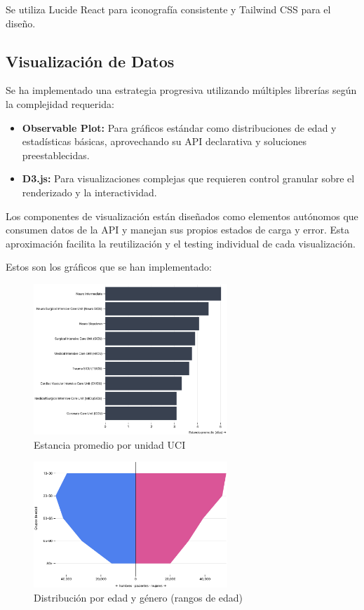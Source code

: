 Se utiliza Lucide React para iconografía consistente y Tailwind CSS para el diseño.

\subsection{Visualización de Datos}

Se ha implementado una estrategia progresiva utilizando múltiples librerías según la complejidad requerida:

\begin{itemize}
\item \textbf{Observable Plot:} Para gráficos estándar como distribuciones de edad y estadísticas básicas, aprovechando su API declarativa y soluciones preestablecidas.
\item \textbf{D3.js:} Para visualizaciones complejas que requieren control granular sobre el renderizado y la interactividad.
\end{itemize}

Los componentes de visualización están diseñados como elementos autónomos que consumen datos de la API y manejan sus propios estados de carga y error. Esta aproximación facilita la reutilización y el testing individual de cada visualización.

Estos son los gráficos que se han implementado:



\begin{figure}[H]
  \centering
  \includegraphics[width=0.65\textwidth]{imagenes/chart1.png}
  \caption{Estancia promedio por unidad UCI}
  \label{fig:chart1}
\end{figure}


\begin{figure}[H]
  \centering
  \includegraphics[width=0.65\textwidth]{imagenes/chart2.png}
  \caption{Distribución por edad y género (rangos de edad)}
  \label{fig:chart2}
\end{figure}

